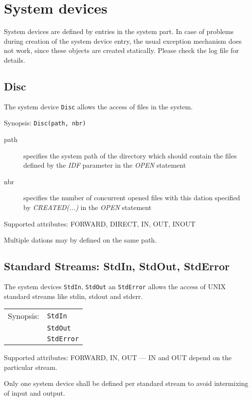 \section{System devices}
\label{x8632devices}

System devices are defined by entries in the system part.
In case of problems during creation of the system device entry, the
usual exception mechanism does not work, since these objects are created
statically. Please check the log file for details.

\subsection{Disc}
The system device \verb|Disc| allows the access of files in the system.

Synopsis: \verb|Disc(path, nbr)|

\begin{description}
\item [path] specifies the system path of the directory which should contain
    the files defined by the {\em IDF} parameter in the {\em OPEN} statement
\item[nbr] specifies the number of concurrent opened files with this dation
     specified by {\em CREATED(...)} in the {\em OPEN} statement
\end{description}

Supported attributes: FORWARD, DIRECT, IN, OUT, INOUT

Multiple dations may by defined on the same path.

\subsection{Standard Streams: StdIn, StdOut, StdError}
The system devices \verb|StdIn|,
\verb|StdOut| an \verb|StdError| allows the access of UNIX standard streams
like stdin, stdout and stderr.

\begin{tabular}{ll}
Synopsis: & \verb|StdIn| \\
          & \verb|StdOut| \\
          & \verb|StdError| \\
\end{tabular}

Supported attributes: FORWARD, IN, OUT --- IN and OUT depend on the
particular stream.

Only one system device shall be defined per standard stream to avoid
intermixing of input and output.

